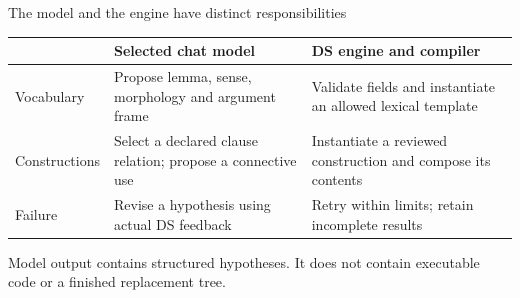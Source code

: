 \documentclass[aspectratio=169,11pt]{beamer}
\newcommand{\keypoint}[1]{\begin{block}{}#1\end{block}}
\begin{document}
\begin{frame}{The model and the engine have distinct responsibilities}
  \color{Ink}
  \begin{tabularx}{\textwidth}{@{}p{30mm}YY@{}}\toprule
    & \textbf{Selected chat model} & \textbf{DS engine and compiler}\\\midrule
    Vocabulary & Propose lemma, sense, morphology and argument frame & Validate fields and instantiate an allowed lexical template\\[5pt]
    Constructions & Select a declared clause relation; propose a connective use & Instantiate a reviewed construction and compose its contents\\[5pt]
    Failure & Revise a hypothesis using actual DS feedback & Retry within limits; retain incomplete results\\\bottomrule
  \end{tabularx}\par
  \vspace{3mm}
  \keypoint{Model output contains structured hypotheses. It does not contain executable code or a finished replacement tree.}
\end{frame}
\end{document}
